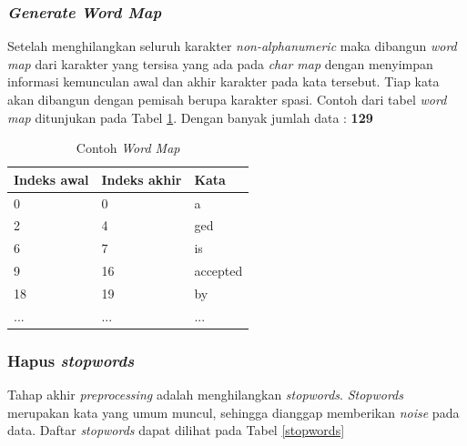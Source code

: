 \documentclass[../Book.tex]{subfiles}
\begin{document}
	\subsubsection{\textit{Generate Word Map}}
	\noindent Setelah menghilangkan seluruh karakter \textit{non-alphanumeric} maka dibangun \textit{word map} dari karakter yang tersisa yang ada pada \textit{char map} dengan menyimpan informasi kemunculan awal dan akhir karakter pada kata tersebut. Tiap kata akan dibangun dengan pemisah berupa karakter spasi. Contoh dari tabel \textit{word map} ditunjukan pada Tabel \ref{wordmap}. Dengan banyak jumlah data : \textbf{129}

	\begin{table}[H]
		\centering
		\caption{Contoh \textit{Word Map}}
		\label{wordmap}
		\begin{tabular}{@{}lll@{}}
			\toprule
			Indeks awal & Indeks akhir & Kata     \\ \midrule
			0           & 0            & a    \\
			2           & 4            & ged       \\
			6           & 7           & is      \\
			9          & 16          & accepted   \\
			18          & 19           & by  \\
			...         & ...          & ... \\ \bottomrule
		\end{tabular}
	\end{table}
	
	\subsubsection{Hapus \textit{stopwords}}
	\noindent Tahap akhir \textit{preprocessing} adalah menghilangkan \textit{stopwords}. \textit{Stopwords} merupakan kata yang umum muncul, sehingga dianggap memberikan \textit{noise} pada data. Daftar \textit{stopwords} dapat dilihat pada Tabel \ref{stopwords}
	
\end{document}
